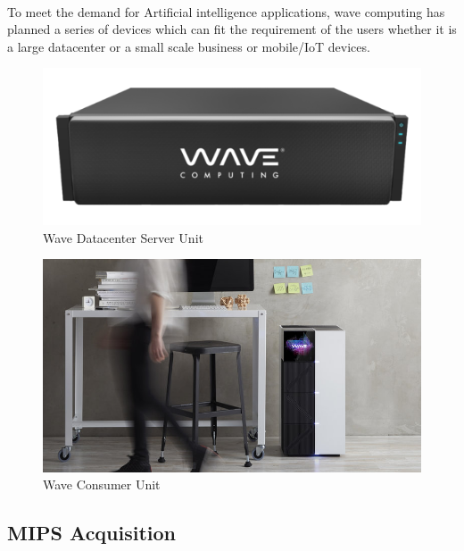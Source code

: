\paragraph{}
To meet the demand for Artificial intelligence applications, wave computing has planned a series of devices which can fit the requirement of the users whether it is a large datacenter or a small scale business or mobile/{IoT} devices.
\begin{figure}[h]
    \centering
    \includegraphics[trim=0cm 0cm 0cm 0cm, clip=true,scale=0.5]{figures/wave_server.png}
    \caption{Wave Datacenter Server Unit\label{Fig:waveserver}}\vspace{-4mm}
    \end{figure}

\begin{figure}[h]
    \centering
    \includegraphics[trim=0cm 0cm 0cm 0cm, clip=true,scale=1]{figures/wave_lab.jpg}
    \caption{Wave Consumer Unit\label{Fig:wavelab}}\vspace{-4mm}
    \end{figure}

\subsection*{MIPS Acquisition}
